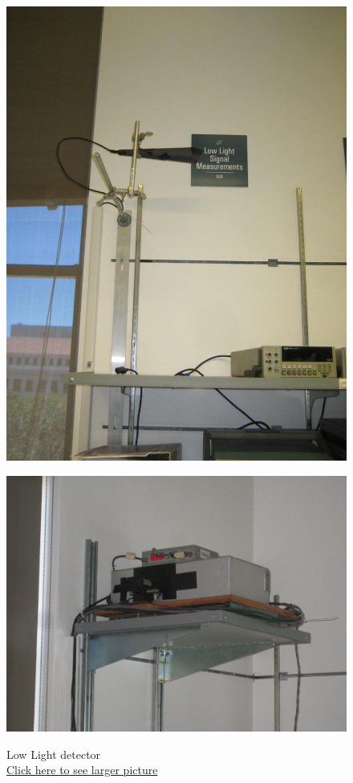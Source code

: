 \documentclass{../lab}
\begin{document}
\noindent
\begin{figure}[!htb]
  \href{http://experimentationlab.berkeley.edu/sites/default/files/IMG_4091.JPG}{\includegraphics[width=\linewidth,keepaspectratio]{images/IMG_4091.JPG}}
  \caption{Low Light detector \\ \href{http://experimentationlab.berkeley.edu/sites/default/files/IMG_4091.JPG}{Click here to see larger picture}}
  \label{fig:IMG_4091.jpg}
\endminipage\hfill
{}
  \href{http://experimentationlab.berkeley.edu/sites/default/files/images/LLS-Source_3439.jpg}{\includegraphics[width=\linewidth,keepaspectratio]{images/LLS-Source_3439.jpg}}

\end{figure}
\end{document}
